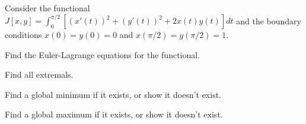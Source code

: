 Consider the functional $J[x,y]=\int_{0}^{\pi/2}[ (x'(t))^2 +
(y'(t))^2+2x(t)y(t)]dt$ and the boundary conditions $x(0)=y(0)=0$ and
$x(\pi/2)=y(\pi/2)=1$. 
\begin{alist}
\item Find the Euler-Lagrange equations for the functional.
\item Find all extremals.
\item Find a global minimum if it exists, or show it doesn't exist.
\item Find a global maximum if it exists, or show it doesn't exist.
\end{alist}
